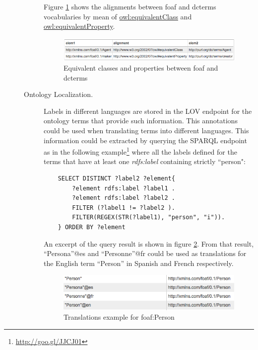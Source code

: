 \begin{description}
\begin{description}
\begin{lstlisting}
	\end{lstlisting}
	
	Figure \ref{fig:eqCR} shows the alignments between foaf and dcterms vocabularies by mean of \url{owl:equivalentClass} and \url{owl:equivalentProperty}.
    \begin{figure}
      \centering
      \includegraphics[width=1.0\linewidth]{img/equivalentCandR.png}
      \caption{Equivalent classes and properties between foaf and dcterms}
      \label{fig:eqCR}
    \end{figure}
    
 \item [Ontology Localization.] Labels in different languages are stored in the LOV endpoint for the ontology terms that provide such information. This annotations could be used when translating terms into different languages. This information could be extracted by querying the SPARQL endpoint as in the following example\footnote{\url{http://goo.gl/JJCJ01}} where all the labels defined for the terms that have at least one \emph{rdfs:label} containing strictly ``person":
		
    \begin{lstlisting}
    SELECT DISTINCT ?label2 ?element{
		?element rdfs:label ?label1 .
		?element rdfs:label ?label2 .
		FILTER (?label1 != ?label2 ).
		FILTER(REGEX(STR(?label1), "person", "i")).
	} ORDER BY ?element
	\end{lstlisting}
							
   An excerpt of the query result is shown in figure \ref{fig:translations}. From that result, ``Persona''@es and ``Personne''@fr could be used as translations for the English term ``Person'' in Spanish and French respectively.
   \begin{figure}
     \centering
     \includegraphics[width=.90\linewidth]{img/translations1.png}
     \caption{Translations example for foaf:Person}
     \label{fig:translations}
   \end{figure}
   
\end{description}


\end{description}
